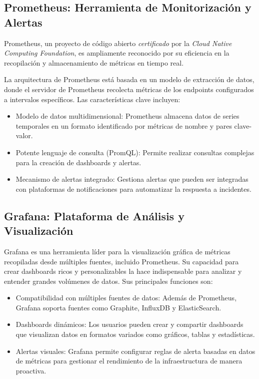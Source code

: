 {        \subsection{Prometheus: Herramienta de Monitorización y Alertas}
            Prometheus, un proyecto de código abierto \textit{certificado} por la \textit{Cloud Native Computing Foundation}, es ampliamente reconocido por su eficiencia en la recopilación y almacenamiento de métricas en tiempo real.

            La arquitectura de Prometheus está basada en un modelo de extracción de datos, donde el servidor de Prometheus recolecta métricas de los endpoints configurados a intervalos específicos. Las características clave incluyen:

            \begin{itemize}
                \item Modelo de datos multidimensional: Prometheus almacena datos de series temporales en un formato identificado por métricas de nombre y pares clave-valor.
                \item Potente lenguaje de consulta (PromQL): Permite realizar consultas complejas para la creación de dashboards y alertas.
                \item Mecanismo de alertas integrado: Gestiona alertas que pueden ser integradas con plataformas de notificaciones para automatizar la respuesta a incidentes.
            \end{itemize}
        
        \subsection{Grafana: Plataforma de Análisis y Visualización}
            Grafana es una herramienta líder para la visualización gráfica de métricas recopiladas desde múltiples fuentes, incluido Prometheus. Su capacidad para crear dashboards ricos y personalizables la hace indispensable para analizar y entender grandes volúmenes de datos. Sus principales funciones son:
            \begin{itemize}
                \item Compatibilidad con múltiples fuentes de datos: Además de Prometheus, Grafana soporta fuentes como Graphite, InfluxDB y ElasticSearch.
                \item Dashboards dinámicos: Los usuarios pueden crear y compartir dashboards que visualizan datos en formatos variados como gráficos, tablas y estadísticas.
                \item Alertas visuales: Grafana permite configurar reglas de alerta basadas en datos de métricas para gestionar el rendimiento de la infraestructura de manera proactiva.
            \end{itemize}
}
